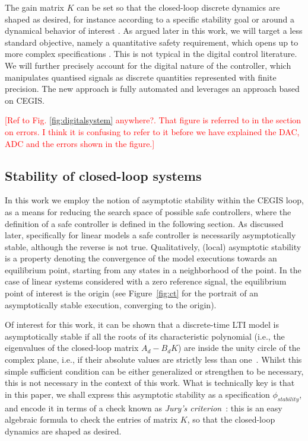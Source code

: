 \documentclass[twocolumn]{autart}    %
\renewcommand{\note}[1]{\textcolor{red}{[#1]}}
\begin{document}
The gain matrix $K$ can be set so that the closed-loop discrete dynamics are
shaped as desired, for instance according to a specific stability goal or
around a dynamical behavior of interest \cite{astrom1997computer}.  As argued
later in this work, we will target a less standard objective,
namely a quantitative safety requirement, which opens up to more complex specifications \cite{BYG16, Tab09}. 
This is not typical in the digital control literature. We will further precisely account for the digital nature
of the controller, which manipulates quantised signals as discrete quantities represented with
finite precision. The new approach is fully automated and leverages an approach based on CEGIS. 


\note{Ref to Fig. \ref{fig:digitalsystem} anywhere?. That figure is referred to in the section on errors. I think it is confusing to
refer to it before we have explained the DAC, ADC and the errors shown in the figure.}

\subsection{Stability of closed-loop systems}

In this work we employ the notion of asymptotic stability within the CEGIS loop,  
as a means for reducing the search space of possible safe controllers, where the definition of a safe controller
is defined in the following section. 
As discussed later, specifically for linear models a safe controller is necessarily asymptotically stable, 
although the reverse is not true. 
Qualitatively, (local) asymptotic stability is a property denoting the convergence of the model executions towards an equilibrium point, 
starting from any states in a neighborhood of the point. 
In the case of linear systems %
considered with a zero reference signal, 
the equilibrium point of interest is the origin (see Figure~\ref{fig:ct} for the portrait of an asymptotically stable execution, converging to the origin). 

Of interest for this work, 
it can be shown that a discrete-time LTI model %
is asymptotically stable if all the roots of its characteristic polynomial (i.e., the
eigenvalues of the closed-loop matrix $A_d - B_d K$) are inside the unity
circle of the complex plane, i.e., if their absolute values are strictly less than
one~\cite{astrom1997computer}. 
Whilst this simple sufficient condition can be either generalized or strengthen to be necessary, 
this is not necessary in the context of this work.    
What is technically key is that in this paper, 
we shall express this asymptotic stability as a specification $\phi_\mathit{stability}$, 
and encode it in terms of a check known as \emph{Jury's criterion}~\cite{fadali}: 
this is an easy algebraic formula to check the entries of matrix $K$, 
so that the closed-loop dynamics are shaped as desired. 
\end{document}
